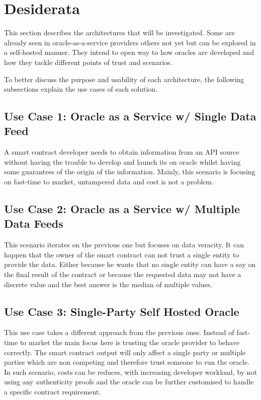 \section{Desiderata}

This section describes the architectures that will be investigated. Some are already seen in oracle-as-a-service providers others not yet but can be explored in a self-hosted manner. They intend to open way to how oracles are developed and how they tackle different points of trust and scenarios.

To better discuss the purpose and usability of each architecture, the following subsections explain the use cases of each solution.



\subsection{Use Case 1: Oracle as a Service w/ Single Data Feed}

A smart contract developer needs to obtain information from an API source without having the trouble to develop and launch its on oracle whilst having some guarantees of the origin of the information. Mainly, this scenario is focusing on fast-time to market, untampered data and cost is not a problem.

\subsection{Use Case 2: Oracle as a Service w/ Multiple Data Feeds}

This scenario iterates on the previous one but focuses on data veracity. It can happen that the owner of the smart contract can not trust a single entity to provide the data. Either because he wants that no single entity can have a say on the final result of the contract or because the requested data may not have a discrete value and the best answer is the median of multiple values.

\subsection{Use Case 3: Single-Party Self Hosted Oracle}

This use case takes a different approach from the previous ones. Instead of fast-time to market the main focus here is trusting the oracle provider to behave correctly. The smart contract output will only affect a single party or multiple parties which are non competing and therefore trust someone to run the oracle. In such scenario, costs can be reduces, with increasing developer workload, by not using any authenticity proofs and the oracle can be further customised to handle a specific contract requirement.

